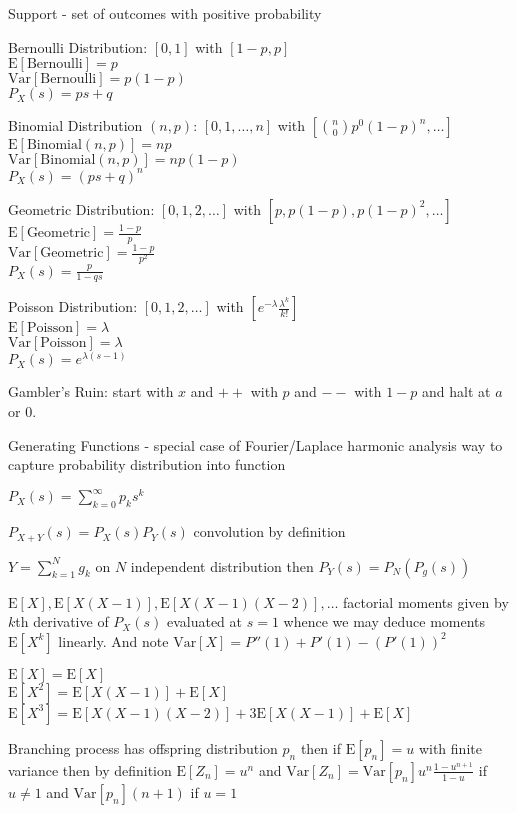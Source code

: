 \twocolumn
Support - set of outcomes with positive probability

Bernoulli Distribution: $[0,1]$ with $[1-p,p]$\\
$\text{E}[\text{Bernoulli}]=p$\\
$\text{Var}[\text{Bernoulli}]=p(1-p)$\\
$P_X(s)=ps+q$

Binomial Distribution $(n,p)$: $[0,1,\dots,n]$ with $[\binom{n}{0}p^0(1-p)^n,\dots]$\\
$\text{E}[\text{Binomial}(n,p)]=np$\\
$\text{Var}[\text{Binomial}(n,p)]=np(1-p)$\\
$P_X(s)=(ps+q)^n$

Geometric Distribution: $[0,1,2,\dots]$ with $[p,p(1-p),p(1-p)^2,\dots]$\\
$\text{E}[\text{Geometric}]=\frac{1-p}{p}$\\
$\text{Var}[\text{Geometric}]=\frac{1-p}{p^2}$\\
$P_X(s)=\frac{p}{1-qs}$

Poisson Distribution: $[0,1,2,\dots]$ with $[e^{-\lambda}\frac{\lambda^k}{k!}]$\\
$\text{E}[\text{Poisson}]=\lambda$\\
$\text{Var}[\text{Poisson}]=\lambda$\\
$P_X(s)=e^{\lambda(s-1)}$

Gambler's Ruin: start with $x$ and $++$ with $p$ and $--$ with $1-p$ and halt at $a$ or $0$.

Generating Functions - special case of Fourier/Laplace harmonic analysis way to capture probability distribution into function

$P_X(s)=\sum_{k=0}^{\infty}p_k s^k$

$P_{X+Y}(s)=P_X(s)P_Y(s)$ convolution by definition

$Y=\sum_{k=1}^N g_k$ on $N$ independent distribution then $P_Y(s)=P_N(P_g(s))$

$\text{E}[X], \text{E}[X(X-1)], \text{E}[X(X-1)(X-2)],\dots$ factorial moments given by $k$th derivative of $P_X(s)$ evaluated at $s=1$ whence we may deduce moments $\text{E}[X^k]$ linearly. And note $\text{Var}[X]=P''(1)+P'(1)-(P'(1))^2$

$\text{E}[X]=\text{E}[X]$\\
$\text{E}[X^2]=\text{E}[X(X-1)]+\text{E}[X]$\\
$\text{E}[X^3]=\text{E}[X(X-1)(X-2)]+3\text{E}[X(X-1)]+\text{E}[X]$

Branching process has offspring distribution $p_n$ then if $\text{E}[p_n]=u$ with finite variance then by definition $\text{E}[Z_n]=u^n$ and $\text{Var}[Z_n]=\text{Var}[p_n]u^n\frac{1-u^{n+1}}{1-u}$ if $u\neq 1$ and $\text{Var}[p_n](n+1)$ if $u=1$

